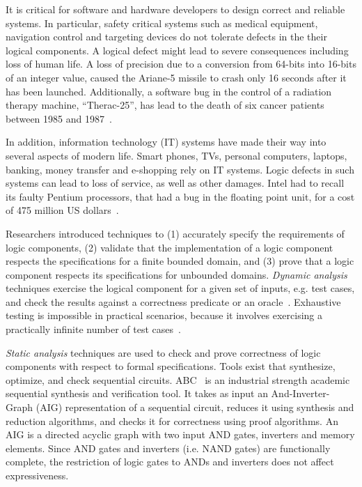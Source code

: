 It is critical for software and hardware developers to design 
correct and reliable systems. In particular, safety critical 
systems such as medical equipment, navigation control and 
targeting devices do not tolerate defects in the their logical 
components. 
A logical defect might lead to severe consequences including loss of human life. 
A loss of precision due to a 
conversion from 64-bits into 16-bits of an integer value, 
caused the Ariane-5 missile to crash only 16 seconds after
it has been launched. Additionally, a software bug in the control of a radiation
therapy machine, ``Therac-25'', has lead to the death of six cancer patients between 
1985 and 1987~\cite{baier2008principles}.

In addition, information technology (IT) systems have made their 
way into several aspects of modern life.
Smart phones, TVs, personal computers, laptops, banking,
money transfer and e-shopping rely on IT systems. 
Logic defects in such systems can lead to loss of service, as well as other damages. 
Intel had to recall its faulty Pentium processors, that had a bug in the floating point unit, 
for a cost of 475 million US dollars~\cite{kropf1999introduction}.

Researchers introduced techniques to 
(1) accurately specify the requirements of logic components, 
(2) validate that the implementation of a logic component respects the specifications for a finite bounded domain, 
and (3) prove that a logic component respects its specifications for unbounded domains. 
{\em Dynamic analysis} techniques exercise the logical component for a given set of inputs, e.g. test cases, and 
check the results against a correctness predicate or an oracle~\cite{baier2008principles}.
Exhaustive testing is impossible in practical scenarios, because it involves exercising a 
practically infinite number of test cases~\cite{ammann2008introduction}.

{\em Static analysis} techniques are used to check and prove correctness 
of logic components with respect to formal specifications. %
Tools exist that synthesize, optimize, and check sequential circuits. 
ABC~\cite{brayton2010abc} is an industrial strength academic sequential synthesis 
and verification tool. It takes as input an And-Inverter-Graph (AIG) representation 
of a sequential circuit, reduces it using synthesis and reduction algorithms, 
and checks it for correctness using proof algorithms. An AIG is a directed acyclic graph with 
two input AND gates, inverters and memory elements. Since AND gates and inverters
(i.e. NAND gates) are functionally complete, the restriction of logic gates to 
ANDs and inverters does not affect expressiveness.

